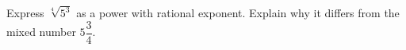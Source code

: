 Express $\sqrt[4]{5^3}$ as a power with rational exponent. Explain why it differs from the mixed number $5\dfrac{3}{4}$.
